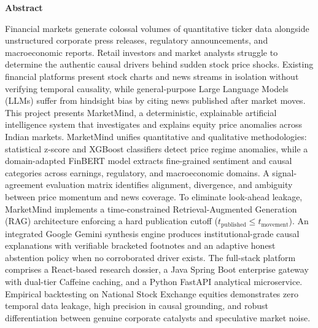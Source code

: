 \documentclass{article}
\begin{document}
	\pagebreak
	\begin{center}
	\Huge\textbf{Abstract}
	\end{center}
	\vspace{0.8cm}
	\par
	\onehalfspacing
	\noindent
	Financial markets generate colossal volumes of quantitative ticker data alongside unstructured corporate press releases, regulatory announcements, and macroeconomic reports. Retail investors and market analysts struggle to determine the authentic causal drivers behind sudden stock price shocks. Existing financial platforms present stock charts and news streams in isolation without verifying temporal causality, while general-purpose Large Language Models (LLMs) suffer from hindsight bias by citing news published after market moves. This project presents MarketMind, a deterministic, explainable artificial intelligence system that investigates and explains equity price anomalies across Indian markets. MarketMind unifies quantitative and qualitative methodologies: statistical z-score and XGBoost classifiers detect price regime anomalies, while a domain-adapted FinBERT model extracts fine-grained sentiment and causal categories across earnings, regulatory, and macroeconomic domains. A signal-agreement evaluation matrix identifies alignment, divergence, and ambiguity between price momentum and news coverage. To eliminate look-ahead leakage, MarketMind implements a time-constrained Retrieval-Augmented Generation (RAG) architecture enforcing a hard publication cutoff ($t_{\text{published}} \le t_{\text{movement}}$). An integrated Google Gemini synthesis engine produces institutional-grade causal explanations with verifiable bracketed footnotes and an adaptive honest abstention policy when no corroborated driver exists. The full-stack platform comprises a React-based research dossier, a Java Spring Boot enterprise gateway with dual-tier Caffeine caching, and a Python FastAPI analytical microservice. Empirical backtesting on National Stock Exchange equities demonstrates zero temporal data leakage, high precision in causal grounding, and robust differentiation between genuine corporate catalysts and speculative market noise.
	
	\pagebreak
	\renewcommand{\contentsname}{\textbf{Table Of Contents} }
	\renewcommand{\cfttoctitlefont}{\huge}
	\tableofcontents\thispagestyle{fancy}
	\setlength{\parindent}{4em}
	\setlength{\parskip}{1em}
	\renewcommand{\baselinestretch}{1.5}
	
\end{document}
